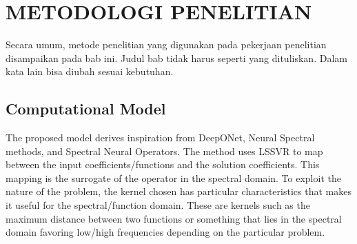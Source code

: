 \chapter{METODOLOGI PENELITIAN}
\label{sec:metodologi_penelitian}

Secara umum, metode penelitian yang digunakan pada pekerjaan penelitian disampaikan pada bab ini. Judul bab tidak harus seperti yang dituliskan. Dalam kata lain bisa diubah sesuai kebutuhan.

\section{Computational Model}
\noindent The proposed model derives inspiration from DeepONet, Neural Spectral methods, and Spectral Neural Operators. The method uses LSSVR to map between the input coefficients/functions and the solution coefficients. This mapping is the surrogate of the operator in the spectral domain. To exploit the nature of the problem, the kernel chosen has particular characteristics that makes it useful for the spectral/function domain. These are kernels such as the maximum distance between two functions or something that lies in the spectral domain favoring low/high frequencies depending on the particular problem.

